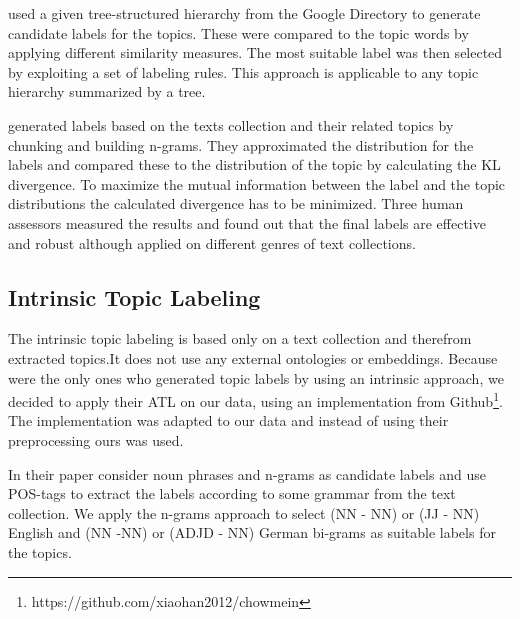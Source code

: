 \textit{\cite{Magatti2009}} used a given tree-structured hierarchy from the Google Directory to generate candidate labels for the topics. These were compared to the topic words by applying different similarity measures. The most suitable label was then selected by exploiting a set of labeling
rules. This approach is applicable to any topic hierarchy summarized by a tree.

\textit{\cite{Mei2007}} generated labels based on the texts collection and their related topics by chunking and building n-grams. They approximated the distribution for the labels and compared these to the distribution of the topic by calculating the \ac{KL} divergence. To maximize the mutual information between the label and the topic distributions the calculated divergence has to be minimized. Three human assessors measured the results and found out that the final labels are effective and robust although applied on different genres of text collections. 


\subsection{Intrinsic Topic Labeling}
\label{sec:intrinsic}
The intrinsic topic labeling is based only on a text collection and therefrom extracted topics.It does not use any external ontologies or embeddings. Because \textit{\cite{Mei2007}} were the only ones who generated topic labels by using an intrinsic approach, we decided to apply their \ac{ATL} on our data, using an implementation from Github\footnote{https://github.com/xiaohan2012/chowmein}. The implementation was adapted to our data and instead of using their preprocessing ours was used.

In their paper \textit{\cite{Mei2007}} consider noun phrases and n-grams as candidate labels and use \acf{POS}-tags to extract the labels according to some grammar from the text collection. We apply the n-grams approach to select (NN - NN) or (JJ - NN) English and (NN -NN) or (ADJD - NN) German bi-grams as suitable labels for the topics.

